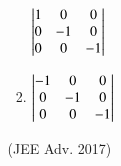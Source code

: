 \documentclass[journal,12pt,twocolumn]{IEEEtran}
\theoremstyle{remark}
\begin{document}
\begin{enumerate}
\begin{enumerate}
\begin{enumerate}
								$\begin{vmatrix}
									1&0&0\\
									0&-1&0\\
									0&0&-1
								\end{vmatrix}$\\
							\item 
								$\begin{vmatrix}
									-1&0&0\\
									0&-1&0\\
									0&0&-1
								\end{vmatrix}$\\
						\end{enumerate}
						\hfill (JEE Adv. 2017)\\
						\begin{comment}
					\item
						Let $S$ be the set of all column matrices 
												$\mydet{						
													b_1\\
													b_2\\
													b_3
												}$
						such that $b_1, b_2, b_3, \in \mathbb{R}$ and the system of equations \brak{in real variables} $$-x+2y+5z=b_1$$ $$2x-4y+3z=b_2$$  $$x-2y+2z=b_3$$ has atleast one solution. Then, which of the following system\brak{s} \brak{in real variables} has\brak{have} at least one solution for each  
												$\mydet{
													b_1\\
													b_2\\
													b_3
												}$
						$\in S$?
						\begin{enumerate}
							\item $x+2y+3z=b_1, 4y+5z=b_2 $ and $x+2y+6z=b_3$
							\item $x+y+3z=b_1, 5x+2y+6z=b_2 $ and $-2x+y-3z=b_3$
							\item $-x+2y+-5z=b_1, 2x-4y+10z=b_2 $ and $x-2y+5z=b_3$
							\item $sx+2y+5z=b_1, 2x+3z=b_2 $ and $x+4y-5z=b_3$
						\end{enumerate}
						\hfill \brak{JEE Adv. 2018}
						\end{comment}


			\end{enumerate}
		
\end{enumerate}
\end{document}
